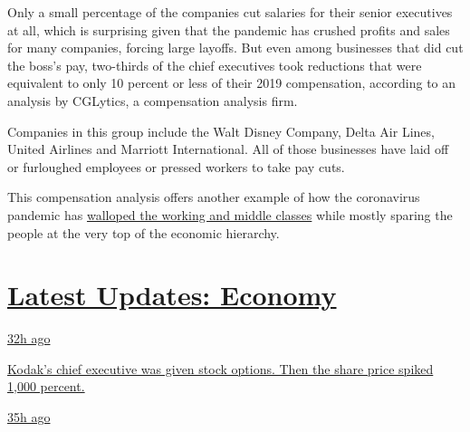 Only a small percentage of the companies cut salaries for their senior
executives at all, which is surprising given that the pandemic has
crushed profits and sales for many companies, forcing large layoffs. But
even among businesses that did cut the boss's pay, two-thirds of the
chief executives took reductions that were equivalent to only 10 percent
or less of their 2019 compensation, according to an analysis by
CGLytics, a compensation analysis firm.

Companies in this group include the Walt Disney Company, Delta Air
Lines, United Airlines and Marriott International. All of those
businesses have laid off or furloughed employees or pressed workers to
take pay cuts.

This compensation analysis offers another example of how the coronavirus
pandemic has
\href{https://www.nytimes3xbfgragh.onion/2020/03/15/world/europe/coronavirus-inequality.html}{walloped
the working and middle classes} while mostly sparing the people at the
very top of the economic hierarchy.

\hypertarget{latest-updates-economy}{%
\section{\texorpdfstring{\href{https://www.nytimes3xbfgragh.onion/live/2020/07/31/business/stock-market-today-coronavirus?action=click\&pgtype=Article\&state=default\&region=MAIN_CONTENT_1\&context=storylines_live_updates}{Latest
Updates:
Economy}}{Latest Updates: Economy}}\label{latest-updates-economy}}

\href{https://www.nytimes3xbfgragh.onion/live/2020/07/31/business/stock-market-today-coronavirus?action=click\&pgtype=Article\&state=default\&region=MAIN_CONTENT_1\&context=storylines_live_updates\#kodaks-chief-executive-was-given-stock-options-then-the-share-price-spiked-1000-percent}{32h
ago}

\href{https://www.nytimes3xbfgragh.onion/live/2020/07/31/business/stock-market-today-coronavirus?action=click\&pgtype=Article\&state=default\&region=MAIN_CONTENT_1\&context=storylines_live_updates\#kodaks-chief-executive-was-given-stock-options-then-the-share-price-spiked-1000-percent}{Kodak's
chief executive was given stock options. Then the share price spiked
1,000 percent.}

\href{https://www.nytimes3xbfgragh.onion/live/2020/07/31/business/stock-market-today-coronavirus?action=click\&pgtype=Article\&state=default\&region=MAIN_CONTENT_1\&context=storylines_live_updates\#fitch-ratings-downgrades-its-outlook-on-us-debt}{35h
ago}

